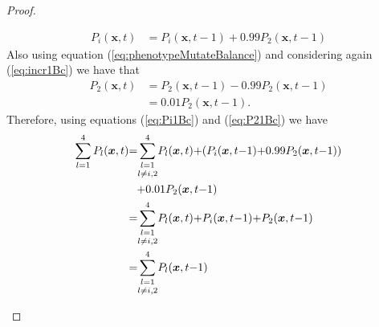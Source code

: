\documentclass[\main/thesis.tex]{subfiles}
\begin{document}
\begin{proof}
\begin{itemize}
\begin{itemize}
\begin{itemize}
\begin{align*}
                             	                       P_i(\boldsymbol{x}, t) &{=} P_i(\boldsymbol{x}, t{-}1)
                             	                        {+} 0.99 P_2(\boldsymbol{x}, t{-}1)
                             	                       \tag{15}
                             	                       \label{eq:Pi1Bc}
                             	                     \end{align*}
                             	                     Also using equation (\ref{eq:phenotypeMutateBalance}) and considering 
                             	                     again (\ref{eq:incr1Bc}) we have that
                             	                     \begin{align*}
                             	                       P_2(\boldsymbol{x}, t) &{=} P_2(\boldsymbol{x}, t{-}1) 
                             	                        {-} 0.99 P_2(\boldsymbol{x}, t{-}1) \\
                             	                       &{=} 0.01 P_2(\boldsymbol{x}, t{-}1).
                                       	               \tag{16}
                             	                       \label{eq:P21Bc}
                             	                     \end{align*}
                             	                     Therefore, using equations (\ref{eq:Pi1Bc}) and (\ref{eq:P21Bc}) we 
                             	                     have 
                             	                     \begin{align*}
                             	                       \sum_{l{=}1}^4 P_l(\boldsymbol{x}, t) 
                             	                       &{=} \underset{l {\ne} i, 2}{\sum_{l{=}1}^4} P_l(\boldsymbol{x}, t)
                             	                        {+} (P_i(\boldsymbol{x}, t{-} 1) {+} 0.99 P_2(\boldsymbol{x},t{-}1)) 
                             	                       \\
                             	                       &\hspace{0.25cm} {+} 0.01 P_2(\boldsymbol{x}, t{-}1) \\
                             	                       &{=} \underset{l {\ne} i, 2}{\sum_{l{=}1}^4} P_l(\boldsymbol{x}, t)
                             	                        {+} P_i(\boldsymbol{x}, t{-}1) {+} P_2(\boldsymbol{x}, t{-}1) \\
                             	                       &{=} \underset{l {\ne} i, 2}{\sum_{l{=}1}^4}P_l(\boldsymbol{x},t{-}1) 

\end{align*}
\end{itemize}
\end{itemize}
\end{itemize}
\end{proof}
\end{document}
